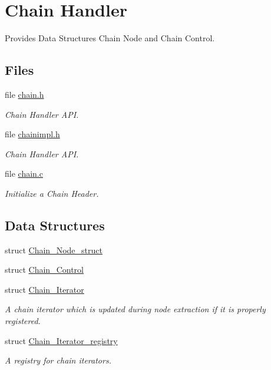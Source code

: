 \hypertarget{group__RTEMSScoreChain}{}\section{Chain Handler}
\label{group__RTEMSScoreChain}


Provides Data Structures Chain Node and Chain Control.  


\subsection*{Files}
\begin{DoxyCompactItemize}
\item 
file \mbox{\hyperlink{score_2chain_8h}{chain.\+h}}
\begin{DoxyCompactList}\small\item\em Chain Handler A\+PI. \end{DoxyCompactList}\item 
file \mbox{\hyperlink{chainimpl_8h}{chainimpl.\+h}}
\begin{DoxyCompactList}\small\item\em Chain Handler A\+PI. \end{DoxyCompactList}\item 
file \mbox{\hyperlink{chain_8c}{chain.\+c}}
\begin{DoxyCompactList}\small\item\em Initialize a Chain Header. \end{DoxyCompactList}\end{DoxyCompactItemize}
\subsection*{Data Structures}
\begin{DoxyCompactItemize}
\item 
struct \mbox{\hyperlink{structChain__Node__struct}{Chain\+\_\+\+Node\+\_\+struct}}
\item 
struct \mbox{\hyperlink{unionChain__Control}{Chain\+\_\+\+Control}}
\item 
struct \mbox{\hyperlink{structChain__Iterator}{Chain\+\_\+\+Iterator}}
\begin{DoxyCompactList}\small\item\em A chain iterator which is updated during node extraction if it is properly registered. \end{DoxyCompactList}\item 
struct \mbox{\hyperlink{structChain__Iterator__registry}{Chain\+\_\+\+Iterator\+\_\+registry}}
\begin{DoxyCompactList}\small\item\em A registry for chain iterators. \end{DoxyCompactList}\end{DoxyCompactItemize}
